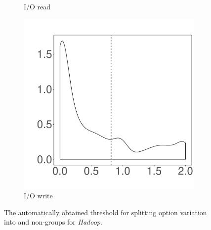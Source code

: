 \begin{figure}[t]
\begin{subfigure}{0.19\textwidth}
                \caption{I/O read}
        \end{subfigure}
        \begin{subfigure}{0.19\textwidth}
                \includegraphics[width=\linewidth]{Figures/iowrite-hadoop-cluster.pdf}
                \caption{I/O write}
        \end{subfigure}
        
	\caption{The automatically obtained threshold for splitting option variation into \inconsistent and non-\inconsistent groups for \emph{Hadoop}.} %
	\label{fig:threshold_hadoop}
\end{figure}

